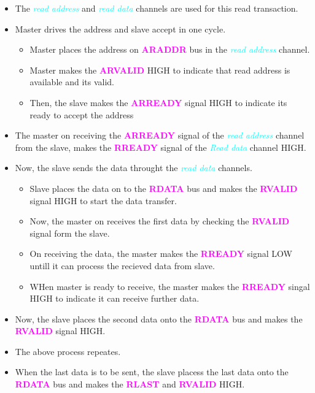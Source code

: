 \documentclass{article}
\newcommand{\chFormat}[1]{\emph{\textcolor{cyan}{#1}}}
\newcommand{\AXISignals}[1]{\textbf{\textcolor{magenta}{#1}}}
\begin{document}
\begin{itemize}
    \item The \chFormat{read address} and \chFormat{read data} channels are used for this read transaction.
    \item Master drives the address and slave accept in one cycle.
    \begin{itemize}
        \item Master places the address on \AXISignals{ARADDR} bus in the \chFormat{read address} channel.
        \item Master makes the \AXISignals{ARVALID} HIGH to indicate that read address is available and its valid.
        \item Then, the slave makes the \AXISignals{ARREADY} signal HIGH to indicate its ready to accept the address
    \end{itemize} 
    \item The master on receiving the \AXISignals{ARREADY} signal of the \chFormat{read address} channel from the slave, makes the \AXISignals{RREADY} signal of the \chFormat{Read data} channel HIGH.
    \item Now, the slave sends the data throught the \chFormat{read data} channels.
    \begin{itemize}
        \item Slave places the data on to the \AXISignals{RDATA} bus and makes the \AXISignals{RVALID} signal HIGH to start the data transfer.
        \item Now, the master on receives the first data by checking the \AXISignals{RVALID} signal form the slave.
        \item On receiving the data, the master makes the \AXISignals{RREADY} signal LOW untill it can process the recieved data from slave.
        \item WHen master is ready to receive, the master makes the \AXISignals{RREADY} singal HIGH to indicate it can receive further data.
    \end{itemize}
    \item Now, the slave places the second data onto the \AXISignals{RDATA} bus and makes the \AXISignals{RVALID} signal HIGH.
    \item The above process repeates.
    \item When the last data is to be sent, the slave placess the last data onto the \AXISignals{RDATA} bus and makes the \AXISignals{RLAST} and \AXISignals{RVALID} HIGH.
\end{itemize}
\end{document}
